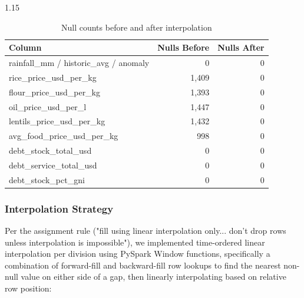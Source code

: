 \documentclass[12pt,a4paper]{article}
\begin{document}
\begin{table}[H]
\centering
\begin{spacing}{1.15}
\caption{Null counts before and after interpolation}
\label{tab:nullcounts}
\begin{tabular}{lrr}
\toprule
\textbf{Column} & \textbf{Nulls Before} & \textbf{Nulls After} \\
\midrule
rainfall\_mm / historic\_avg / anomaly & 0     & 0 \\
rice\_price\_usd\_per\_kg              & 1,409 & 0 \\
flour\_price\_usd\_per\_kg             & 1,393 & 0 \\
oil\_price\_usd\_per\_l               & 1,447 & 0 \\
lentils\_price\_usd\_per\_kg           & 1,432 & 0 \\
avg\_food\_price\_usd\_per\_kg         &   998 & 0 \\
debt\_stock\_total\_usd                &     0 & 0 \\
debt\_service\_total\_usd              &     0 & 0 \\
debt\_stock\_pct\_gni                  &     0 & 0 \\
\bottomrule
\end{tabular}
\end{spacing}
\end{table}

\subsubsection{Interpolation Strategy}

Per the assignment rule ("fill using linear interpolation only... don't drop rows unless interpolation is impossible"), we implemented time-ordered linear interpolation per division using PySpark Window functions, specifically a combination of forward-fill and backward-fill row lookups to find the nearest non-null value on either side of a gap, then linearly interpolating based on relative row position:
\end{document}
